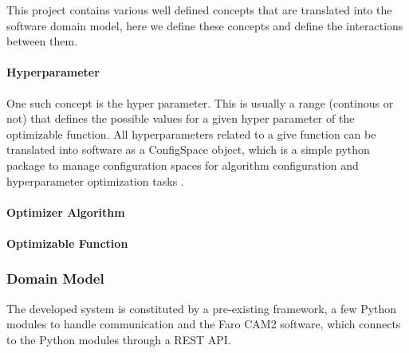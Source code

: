 This project contains various well defined concepts that are translated into the software domain model, here we define these concepts and define the interactions between them.

\paragraph{Hyperparameter}

One such concept is the hyper parameter. This is usually a range (continous or not) that defines the possible values for a given hyper parameter of the optimizable function. All hyperparameters related to a give function can be translated into software as a ConfigSpace object, which is a simple python package to manage configuration spaces for algorithm configuration and hyperparameter optimization tasks \parencite{BOAH}. 

\paragraph{Optimizer Algorithm}

\paragraph{Optimizable Function}

\subsubsection{Domain Model}

The developed system is constituted by a pre-existing framework, a few Python modules to handle communication and the Faro CAM2 software, which connects to the Python modules through a REST API.

